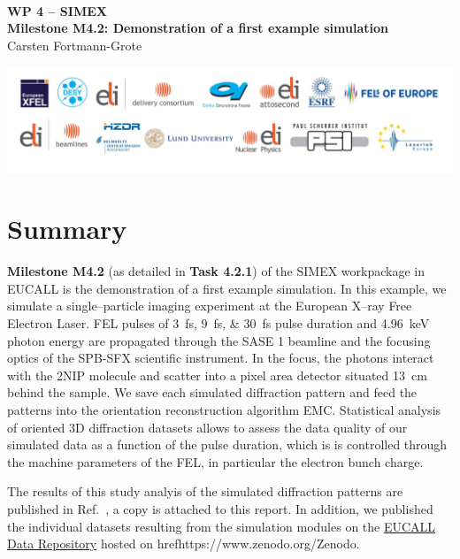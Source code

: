 \documentclass[12pt]{scrartcl}
\begin{document}
\makeatletter
\begin{titlepage}
\thispagestyle{scrheadings}
\begin{center}
  $~$\\
  \vspace{2cm}
  \Huge{\textbf{WP 4 -- SIMEX\\[1cm]
    Milestone M4.2: Demonstration of a first example simulation%
  }}\\
  \vspace{2cm}
  \large{ Carsten Fortmann-Grote}
  \vspace{1cm}
  \date{\today}
\end{center}
\vfill%
\includegraphics[width=\textwidth]{PartnerLogos.pdf}
\normalfont
\end{titlepage}
\makeatother
%
\tableofcontents
%
\section{Summary}
\textbf{Milestone M4.2} (as detailed in \textbf{Task 4.2.1}) of the SIMEX workpackage in EUCALL is the demonstration of a
first example simulation. In this example, we simulate a single--particle
imaging experiment at the European X--ray Free Electron Laser. FEL pulses of
\SIlist{3;9;30}{\fs} pulse duration and \SI{4.96}{\keV} photon energy are propagated
through the SASE 1 beamline and the focusing optics of the SPB-SFX scientific
instrument. In the focus, the photons interact with the 2NIP molecule and
scatter into a pixel area detector situated \SI{13}{cm} behind the sample. We
save each simulated diffraction pattern and feed the patterns into the
orientation reconstruction algorithm EMC. Statistical analysis of oriented 3D
diffraction datasets allows to assess the data quality of our simulated data as
a function of the pulse duration, which is is controlled through the machine
parameters of the FEL, in particular the electron bunch charge.

The results of this study analyis of the simulated diffraction patterns are published in
Ref.~\cite{Fortmann-Grote2017}, a copy is attached to this report. In addition, we published the individual
datasets resulting from the simulation modules on the
\href{https://zenodo.org/communities/eucall-data}{EUCALL Data Repository} hosted
on href{https://www.zenodo.org/}{Zenodo}.
\end{document}
